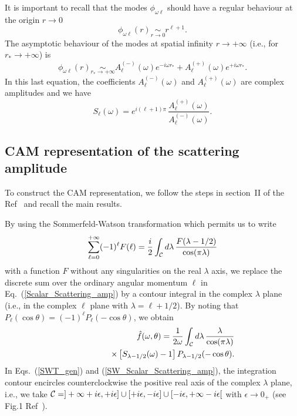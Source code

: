 \documentclass[aps,prd,longbibliography,reprint,twocolumn,amsmath,amssymb,amsfonts,showpacs,superscriptaddress]{revtex4-1}%
\begin{document}
It is important to recall that the modes $\phi_{\omega \ell}$ should have a regular behaviour at the origin $r \to 0$
\begin{equation}\label{bc_1_in}
\phi_{\omega  \ell}(r) \scriptstyle{\underset{r \to 0}{\sim}}
\displaystyle{r^{\ell+1}}.
\end{equation}
The asymptotic behaviour of the modes at spatial infinity $r \to +\infty$ (i.e., for $r_\ast \to +\infty$) is
\begin{equation}\label{bc_2_in}
\phi_{\omega  \ell}(r) \scriptstyle{\underset{r_\ast \to +\infty}{\sim}}
\displaystyle{ A^{(-)}_\ell (\omega) e^{-i\omega r_\ast} + A^{(+)}_\ell (\omega) e^{+i\omega r_\ast}}.
\end{equation}
In this last equation, the coefficients $A^{(-)}_\ell (\omega)$ and  $A^{(+)}_\ell (\omega)$ are complex amplitudes and we have
\begin{equation}\label{Matrix_S}
  S_{\ell}(\omega) =  e^{i(\ell+1)\pi} \, \frac{A_{\ell}^{(+)}(\omega)}{A_{\ell}^{(-)}(\omega)}.
\end{equation}

\subsection{CAM representation of the scattering amplitude}
\label{SecIIc}

To construct the CAM representation, we follow the steps in section~II of the Ref~\cite{Folacci:2019cmc} and recall the main results.


By using the Sommerfeld-Watson transformation \cite{Watson18,Sommerfeld49,Newton:1982qc} which permits us to write
\begin{equation}\label{SWT_gen}
\sum_{\ell=0}^{+\infty} (-1)^\ell F(\ell)= \frac{i}{2} \int_{\cal C} d\lambda \, \frac{F(\lambda -1/2)}{\cos (\pi \lambda)}
\end{equation}
with a function $F$ without any singularities on the real $\lambda$ axis, we replace the discrete sum over the ordinary angular momentum $\ell$ in Eq.~(\ref{Scalar_Scattering_amp}) by a contour integral in the complex $\lambda$ plane (i.e., in the complex $\ell$ plane with $\lambda = \ell +1/2$). By noting that $P_\ell (\cos \theta)=(-1)^\ell P_\ell (-\cos \theta)$, we obtain
\begin{eqnarray}\label{SW_Scalar_Scattering_amp}
& & \hat{f}(\omega,\theta) = \frac{1}{2 \omega}  \int_{\cal C} d\lambda \, \frac{\lambda}{\cos (\pi \lambda)} \nonumber \\
&&  \qquad\qquad   \times \left[ S_{\lambda -1/2} (\omega) -1 \right]P_{\lambda -1/2} (-\cos \theta).
\end{eqnarray}
In Eqs.~(\ref{SWT_gen}) and (\ref{SW_Scalar_Scattering_amp}), the integration contour encircles counterclockwise the positive real axis of the complex $\lambda$ plane, i.e., we take ${\cal C}=]+\infty +i\epsilon,+i\epsilon] \cup
[+i\epsilon,-i\epsilon] \cup [-i\epsilon, +\infty -i\epsilon[$ with $\epsilon \to 0_+$ (see Fig.1 Ref~\cite{Folacci:2019cmc}).
\end{document}
